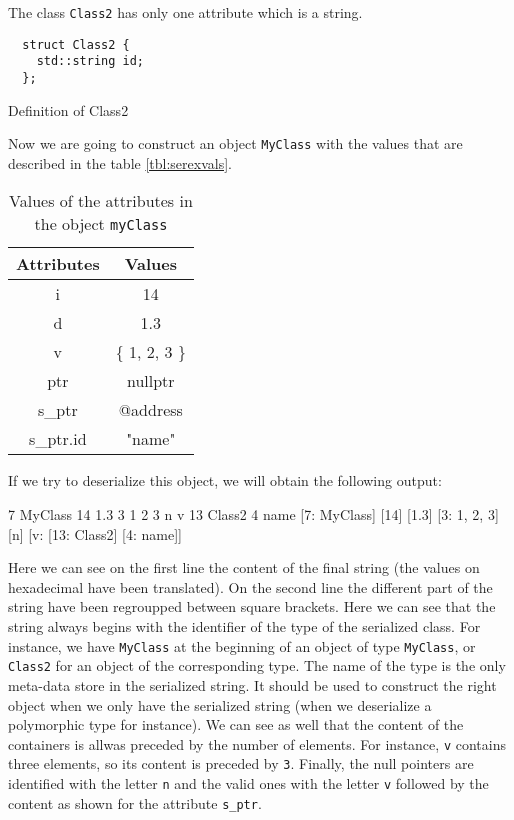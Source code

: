 The class \texttt{Class2} has only one attribute which is a string.

\begin{listing}[ht!]
\begin{verbatim}
  struct Class2 {
    std::string id;
  };
\end{verbatim}
\caption{Definition of Class2}
\label{lst:serexmysecondclass}
\end{listing}

Now we are going to construct an object \texttt{MyClass} with the values that
are described in the table \ref{tbl:serexvals}.

\begin{table}[h!]
\centering
\begin{tabular}{|c|c|}
 \hline
 Attributes & Values \\
 \hline\hline
  i & 14 \\
 \hline
  d & 1.3 \\
 \hline
  v & \{ 1, 2, 3 \} \\
 \hline
  ptr & nullptr \\
 \hline
  s\_ptr & @address \\
 \hline\hline
  s\_ptr.id & "name" \\
 \hline
\end{tabular}
\caption{Values of the attributes in the object \texttt{myClass}}
\label{tlb:serexvals}
\end{table}

If we try to deserialize this object, we will obtain the following output:

\begin{format}
  7 MyClass 14 1.3 3 1 2 3 n v 13 Class2 4 name
  [7: MyClass] [14] [1.3] [3: 1, 2, 3] [n] [v: [13: Class2] [4: name]]
\end{format}\leavevmode\newline

Here we can see on the first line the content of the final string (the values on
hexadecimal have been translated). On the second line the different part of the
string have been regroupped between square brackets. Here we can see that the
string always begins with the identifier of the type of the serialized class.
For instance, we have \texttt{MyClass} at the beginning of an object of type
\texttt{MyClass}, or \texttt{Class2} for an object of the corresponding type.
The name of the type is the only meta-data store in the serialized string. It
should be used to construct the right object when we only have the serialized
string (when we deserialize a polymorphic type for instance). We can see as well
that the content of the containers is allwas preceded by the number of elements.
For instance, \texttt{v} contains three elements, so its content is preceded by
\texttt{3}. Finally, the null pointers are identified with the letter \texttt{n}
and the valid ones with the letter \texttt{v} followed by the content as shown
for the attribute \texttt{s\_ptr}.

